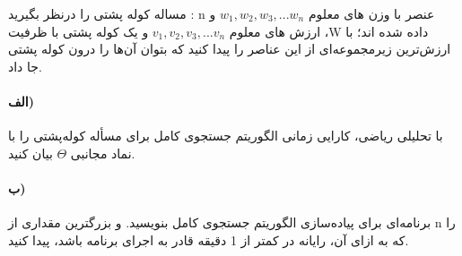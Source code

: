 \documentclass[]{article}
\begin{document}
مساله کوله پشتی را درنظر بگیرید :
n عنصر با وزن های معلوم
$w_1, w_2, w_3,... w_n$
و ارزش های معلوم $v_1, v_2, v_3,... v_n$
و یک کوله پشتی با ظرفیت ،W داده شده اند؛
با ارزش‌ترین زیرمجموعه‌ای از این عناصر را پیدا کنید که بتوان آن‌ها را درون کوله پشتی جا داد.
\paragraph[1.1]{الف)}
با تحلیلی ریاضی، کارایی زمانی الگوریتم جستجوی کامل برای مسأله کوله‌پشتی را با نماد مجانبی $\Theta$ بیان کنید.

\paragraph[1.2]{ب)}
برنامه‌ای برای پیاده‌سازی الگوریتم جستجوی کامل بنویسید. و بزرگترین مقداری از n را که به ازای آن، رایانه در کمتر از 1 دقیقه قادر به اجرای برنامه باشد، پیدا کنید. 
\end{document}

